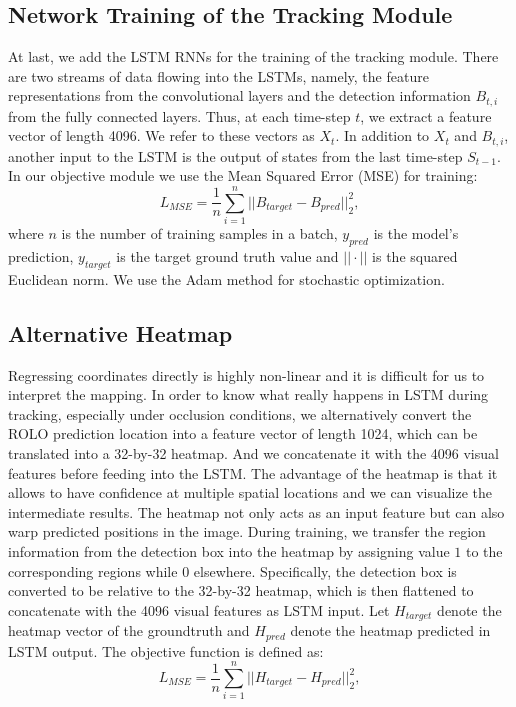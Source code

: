 \documentclass{article}
\begin{document}
\subsection{Network Training of the Tracking Module}

At last, we add the LSTM RNNs for the training of the tracking module. There are two streams of data flowing into the LSTMs, namely, the feature representations from the convolutional layers and the detection information $B_{t,i}$ from the fully connected layers.
Thus, at each time-step $t$, we extract a feature vector of length 4096. We refer to these vectors as $X_{t}$. In addition to $X_{t}$ and $B_{t,i}$, another input to the LSTM is the output of states from the last time-step $S_{t-1}$.
In our objective module we use the Mean Squared Error (MSE) for training:
\begin{equation}
L_{MSE} = \frac{1}{n} \sum_{i=1}^{n} ||B_{target} - B_{pred} ||_{2}^{2},
\end{equation}
where $n$ is the number of training samples in a batch, $y_{pred}$ is the model’s prediction, $y_{target}$ is the target ground truth value and $||\cdot||$ is the squared Euclidean norm. We use the Adam method for stochastic optimization.

\subsection{Alternative Heatmap}
Regressing coordinates directly is highly non-linear and it is difficult for us to interpret the mapping.
In order to know what really happens in LSTM during tracking, especially under occlusion conditions, we alternatively convert the ROLO prediction location into a feature vector of length 1024, which can be translated into a 32-by-32 heatmap.
And we concatenate it with the 4096 visual features before feeding into the LSTM.
The advantage of the heatmap is that it allows to have confidence at multiple spatial locations and we can visualize the intermediate results.
The heatmap not only acts as an input feature but can also warp predicted positions in the image.
During training, we transfer the region information from the detection box into the heatmap by assigning value $1$ to the corresponding regions while $0$ elsewhere. Specifically, the detection box is converted to be relative to the 32-by-32 heatmap, which is then flattened to concatenate with the 4096 visual features as LSTM input.
Let $H_{target}$ denote the heatmap vector of the groundtruth and $H_{pred}$ denote the heatmap predicted in LSTM output. The objective function is defined as:
\begin{equation}
	L_{MSE} = \frac{1}{n} \sum_{i=1}^{n} ||H_{target} - H_{pred} ||_{2}^{2},
\end{equation}
\end{document}
